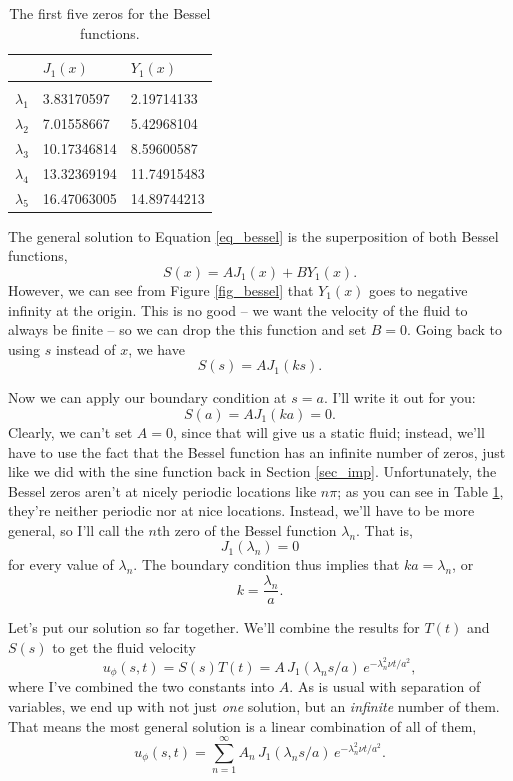 \begin{table}[t]
\centering
  \begin{tabular}{l|l|l}
  & $J_1(x)$ & $Y_1(x)$ \\
  \hline \\
   $\lambda_1$ & 3.83170597   & 2.19714133    \\
   $\lambda_2$ & 7.01558667 & 5.42968104   \\
   $\lambda_3$ & 10.17346814 & 8.59600587  \\
   $\lambda_4$ & 13.32369194 & 11.74915483 \\
   $\lambda_5$ & 16.47063005 & 14.89744213
  \end{tabular}
  \caption{The first five zeros for the Bessel functions.}
  \label{tab_bessel}
\end{table}

The general solution to Equation \ref{eq_bessel} is the superposition of both Bessel functions, 
\[
S(x) = A J_1(x) + B Y_1(x).
\]
However, we can see from Figure \ref{fig_bessel} that $Y_1(x)$ goes to negative infinity at the origin.  This is no good -- we want the velocity of the fluid to always be finite -- so we can drop the this function and set $B=0$.  Going back to using $s$ instead of $x$, we have
\[
S(s) = A J_1(ks).
\]

Now we can apply our boundary condition at $s=a$.  I'll write it out for you:
\[
S(a) = A J_1 (ka) = 0.
\]
Clearly, we can't set $A=0$, since that will give us a static fluid; instead, we'll have to use the fact that the Bessel function has an infinite number of zeros, just like we did with the sine function back in Section \ref{sec_imp}.  Unfortunately, the Bessel zeros aren't at nicely periodic locations like $n\pi$; as you can see in Table \ref{tab_bessel}, they're neither periodic nor at nice locations.  Instead, we'll have to be more general, so I'll call the $n$th zero of the Bessel function $\lambda_n$.  That is, 
\[
J_1(\lambda_n) = 0
\]
for every value of $\lambda_n$.  The boundary condition thus implies that $ka = \lambda_n$, or
\[
k = \frac{\lambda_n }{a}.
\]

Let's put our solution so far together.  We'll combine the results for $T(t)$ and $S(s)$ to get the fluid velocity
\[
u_\phi(s, t) = S(s) T(t) = A \, J_1(\lambda_n s / a) \, e^{-\lambda_n^2 \nu t /a^2},
\]
where I've combined the two constants into $A$.  As is usual with separation of variables, we end up with not just \emph{one} solution, but an \emph{infinite} number of them.  That means the most general solution is a linear combination of all of them,
\begin{equation}
u_\phi(s, t) = \sum_{n=1}^\infty A_n \, J_1(\lambda_n s / a) \, e^{-\lambda_n^2 \nu t /a^2}.
\end{equation}

